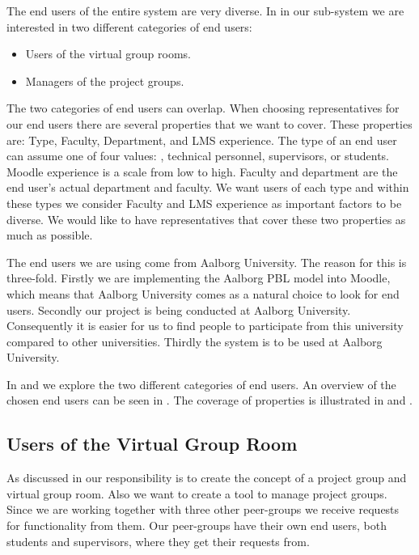 The end users of the entire system are very diverse.
In in our sub-system we are interested in two different categories of end users:
\begin{itemize}
	\item Users of the virtual group rooms.
	\item Managers of the project groups.
\end{itemize}
The two categories of end users can overlap. 
When choosing representatives for our end users there are several properties that we want to cover. 
These properties are: Type, Faculty, Department, and LMS experience.
The type of an end user can assume one of four values: \admpers[c], technical personnel, supervisors, or students.
Moodle experience is a scale from low to high.
Faculty and department are the end user's actual department and faculty. %
We want users of each type and within these types we consider Faculty and LMS experience as important factors to be diverse.
We would like to have representatives that cover these two properties as much as possible.


The end users we are using come from Aalborg University.
The reason for this is three-fold.
Firstly we are implementing the Aalborg PBL model into Moodle, which means that Aalborg University comes as a natural choice to look for end users.
Secondly our project is being conducted at Aalborg University. 
Consequently it is easier for us to find people to participate from this university compared to other universities. 
Thirdly the system is to be used at Aalborg University.

In  and  we explore the two different categories of end users. 
An overview of the chosen end users can be seen in .
The coverage of properties is illustrated in  and .


\subsection{Users of the Virtual Group Room}
\label{sub:endusersmembers}
As discussed in  our responsibility is to create the concept of a project group and virtual group room.
Also we want to create a tool to manage project groups.
Since we are working together with three other peer-groups we receive requests for functionality from them.
Our peer-groups have their own end users, both students and supervisors, where they get their requests from.

